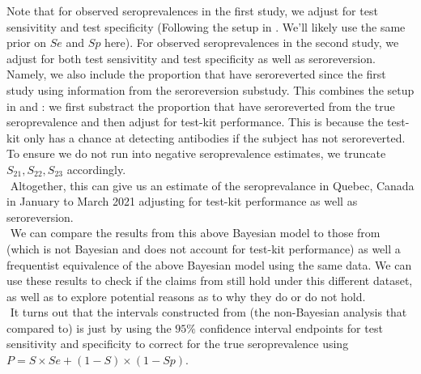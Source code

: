 Note that for observed seroprevalences in the first study, we adjust for test sensivitity and test specificity (Following the setup in \cite{meyer2022adjusting}. We'll likely use the same prior on $Se$ and $Sp$ here). For observed seroprevalences in the second study, we adjust for both test sensivitity and test specificity as well as seroreversion. Namely, we also include the proportion that have seroreverted since the first study using information from the seroreversion substudy. This combines the setup in \cite{lewin2022seroprevalence} and \cite{meyer2022adjusting}: we first substract the proportion that have seroreverted from the true seroprevalence and then adjust for test-kit performance. This is because the test-kit only has a chance at detecting antibodies if the subject has not seroreverted. To ensure we do not run into negative seroprevalence estimates, we truncate $S_{21}, S_{22}, S_{23}$ accordingly.\\
\newline $ $
Altogether, this can give us an estimate of the seroprevalance in Quebec, Canada in January to March 2021 adjusting for test-kit performance as well as seroreversion.\\
\newline $ $
We can compare the results from this above Bayesian model to those from \cite{lewin2022seroprevalence} (which is not Bayesian and does not account for test-kit performance) as well a frequentist equivalence of the above Bayesian model using the same data. We can use these results to check if the claims from \cite{lewin2022seroprevalence} still hold under this different dataset, as well as to explore potential reasons as to why they do or do not hold.\\
\newline $ $
It turns out that the intervals constructed from \cite{rosenberg2020cumulative} (the non-Bayesian analysis that \cite{meyer2022adjusting} compared to) is just by using the $95\%$ confidence interval endpoints for test sensitivity and specificity to correct for the true seroprevalence using $P = S \times Se + (1-S) \times (1-Sp)$.